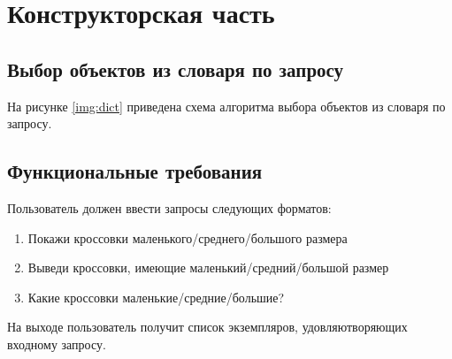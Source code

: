 \chapter{Конструкторская часть}

\section{Выбор объектов из словаря по запросу}
На рисунке \ref{img:dict} приведена схема алгоритма выбора объектов из словаря по запросу.

\clearpage

\section{Функциональные требования}

Пользователь должен ввести запросы следующих форматов:

\begin{enumerate}
	\item Покажи кроссовки маленького/среднего/большого размера
	\item Выведи кроссовки, имеющие маленький/средний/большой размер
	\item Какие кроссовки маленькие/средние/большие?
\end{enumerate}

На выходе пользователь получит список экземпляров, удовляютворяющих входному запросу.

